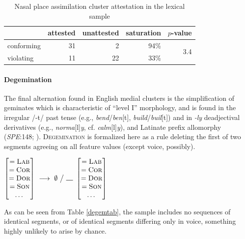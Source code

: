 \begin{table}
\centering
\begin{tabular}{l rrrr}
\toprule
           & attested & unattested & saturation & $p$-value \\
\midrule
conforming & 31       & 2          & 94\%       & \multirow{2}{*}{3.4\e{-07}} \\
violating  & 11       & 22         & 33\%       \\
\bottomrule
\end{tabular}
\caption{Nasal place assimilation cluster attestation in the lexical sample}
\label{npatab}
\end{table}

\paragraph{Degemination} 
The final alternation found in English medial clusters is the simplification of geminates which is characteristic of ``level I'' morphology, and is found in the irregular /-t/ past tense (e.g., \emph{bend}/\emph{ben}[t], \emph{build}/\emph{buil}[t]) and in \emph{-ly} deadjectival derivatives (e.g., \emph{norma}[l]\emph{y}, cf. \emph{calm}[l]\emph{y}), and Latinate prefix allomorphy (\emph{SPE}:148; \citealt[102]{Borowsky1986}). \textsc{Degemination} is formalized here as a rule deleting the first of two segments agreeing on all feature values (except voice, possibly).
\label{degemx}

\begin{example}
$\begin{bmatrix} =\textsc{Lab} \\ =\textsc{Cor} \\ =\textsc{Dor} \\ =\textsc{Son} \\ \ldots{} \end{bmatrix}~\goesto~\emptyset~\big /~\gap~\begin{bmatrix} =\textsc{Lab} \\ =\textsc{Cor} \\ =\textsc{Dor} \\ =\textsc{Son} \\ \ldots{} \end{bmatrix}$
\end{example}

\noindent
As can be seen from Table \ref{degemtab}, the sample includes no sequences of identical segments, or of identical segments differing only in voice, something highly unlikely to arise by chance.

